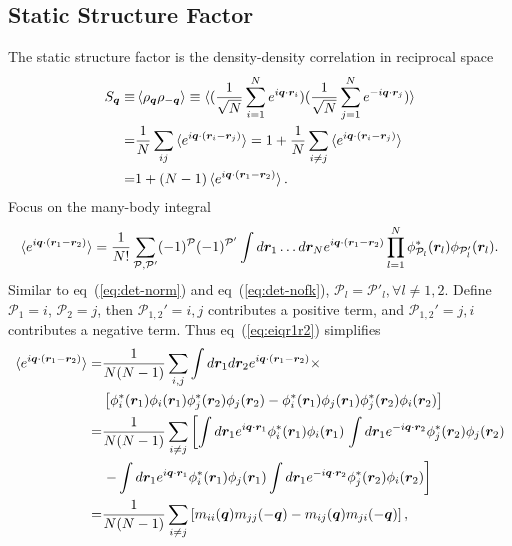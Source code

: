 \subsection{Static Structure Factor}
\label{sec:wf-pw-sdet-sk}
The static structure factor is the density-density correlation in reciprocal space
\begin{align}
S_{\boldsymbol{q}} \equiv& \braket{\rho_{\boldsymbol{q}}\rho_{-\boldsymbol{q}}} \equiv \braket{
(\frac{1}{\sqrt{N}}\sum\limits_{i=1}^N e^{i\boldsymbol{q}\cdot\boldsymbol{r}_i})
(\frac{1}{\sqrt{N}}\sum\limits_{j=1}^N e^{-i\boldsymbol{q}\cdot\boldsymbol{r}_j})
} \nonumber \\
=& \frac{1}{N}\sum_{ij}\braket{e^{i\boldsymbol{q}\cdot(\boldsymbol{r}_i-\boldsymbol{r}_j)}} =
1 + \frac{1}{N}\sum_{i\neq j}\braket{e^{i\boldsymbol{q}\cdot(\boldsymbol{r}_i-\boldsymbol{r}_j)}} \nonumber \\
=& 1+(N-1)\braket{e^{i\boldsymbol{q}\cdot(\boldsymbol{r}_1-\boldsymbol{r}_2)}}.
\end{align}
Focus on the many-body integral
\begin{align}
\braket{e^{i\boldsymbol{q}\cdot(\boldsymbol{r}_1-\boldsymbol{r}_2)}} = \dfrac{1}{N!} \sum\limits_{\mathcal{P},\mathcal{P'}} 
(-1)^{\mathcal{P}} (-1)^{\mathcal{P'}} \int d\boldsymbol{r}_1\dots d\boldsymbol{r}_N
e^{i\boldsymbol{q}\cdot(\boldsymbol{r}_1-\boldsymbol{r}_2)}
\prod\limits_{l=1}^{N} \phi^*_{\mathcal{P}_l}(\boldsymbol{r}_l)\phi_{\mathcal{P}_l'}(\boldsymbol{r}_l). \label{eq:eiqr1r2}
\end{align}
Similar to eq~(\ref{eq:det-norm}) and eq~(\ref{eq:det-nofk}), $\mathcal{P}_l=\mathcal{P}'_l, \forall l\neq1, 2$. Define $\mathcal{P}_1=i$, $\mathcal{P}_2=j$, then $\mathcal{P}_{1,2}'=i, j$ contributes a positive term, and $\mathcal{P}_{1,2}'=j, i$ contributes a negative term. Thus eq~(\ref{eq:eiqr1r2}) simplifies
\begin{align}
\braket{e^{i\boldsymbol{q}\cdot(\boldsymbol{r}_1-\boldsymbol{r}_2)}} =& \dfrac{1}{N(N-1)} \sum\limits_{i, j}
 \int d\boldsymbol{r}_1d\boldsymbol{r}_2
e^{i\boldsymbol{q}\cdot(\boldsymbol{r}_1-\boldsymbol{r}_2)} \times \nonumber \\
&\left[
\phi^*_{i}(\boldsymbol{r}_1)\phi_{i}(\boldsymbol{r}_1)\phi^*_{j}(\boldsymbol{r}_2)\phi_{j}(\boldsymbol{r}_2) - 
\phi^*_{i}(\boldsymbol{r}_1)\phi_{j}(\boldsymbol{r}_1)\phi^*_{j}(\boldsymbol{r}_2)\phi_{i}(\boldsymbol{r}_2)
\right] \nonumber \\
=& \dfrac{1}{N(N-1)} \sum\limits_{i\neq j} \left[
\int d\boldsymbol{r}_1 e^{i\boldsymbol{q}\cdot\boldsymbol{r}_1} \phi^*_{i}(\boldsymbol{r}_1)\phi_{i}(\boldsymbol{r}_1) \right.
\int d\boldsymbol{r}_1 e^{-i\boldsymbol{q}\cdot\boldsymbol{r}_2} \phi^*_{j}(\boldsymbol{r}_2)\phi_{j}(\boldsymbol{r}_2) \nonumber \\
& \left. - \int d\boldsymbol{r}_1 e^{i\boldsymbol{q}\cdot\boldsymbol{r}_1} \phi^*_{i}(\boldsymbol{r}_1)\phi_{j}(\boldsymbol{r}_1)
\int d\boldsymbol{r}_1 e^{-i\boldsymbol{q}\cdot\boldsymbol{r}_2} \phi^*_{j}(\boldsymbol{r}_2)\phi_{i}(\boldsymbol{r}_2)
\right] \nonumber \\
=& \dfrac{1}{N(N-1)} \sum\limits_{i\neq j} \left[
m_{ii}(\boldsymbol{q})m_{jj}(-\boldsymbol{q}) - m_{ij}(\boldsymbol{q})m_{ji}(-\boldsymbol{q})
\right],
\end{align}
